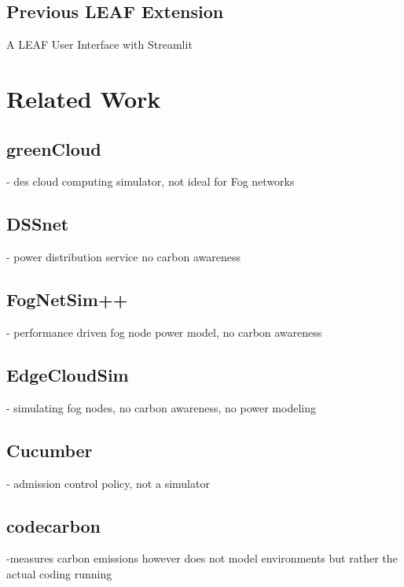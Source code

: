 \documentclass{l4proj}
\begin{document}
\subsection{Previous LEAF Extension}
A LEAF User Interface with Streamlit

\section{Related Work}

\subsection{greenCloud}
- des cloud computing simulator, not ideal for Fog networks

\subsection{DSSnet}
- power distribution service no carbon awareness

\subsection{FogNetSim++}
- performance driven fog node power model, no carbon awareness

\subsection{EdgeCloudSim}
- simulating fog nodes, no carbon awareness, no power modeling

\subsection{Cucumber}
- admission control policy, not a simulator

\subsection{codecarbon}
-measures carbon emissions however does not model environments but rather the actual coding running
\end{document}
